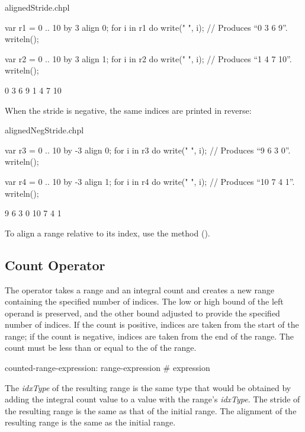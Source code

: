 \begin{chapelexample}{alignedStride.chpl}
\begin{chapel}
var r1 = 0 .. 10 by 3 align 0;
for i in r1 do
  write(" ", i);			// Produces ``0 3 6 9''.
writeln();

var r2 = 0 .. 10 by 3 align 1;
for i in r2 do
  write(" ", i);			// Produces ``1 4 7 10''.
writeln();
\end{chapel}
\begin{chapeloutput}
 0 3 6 9
 1 4 7 10
\end{chapeloutput}
\end{chapelexample}

When the stride is negative, the same indices are printed in reverse:
\begin{chapelexample}{alignedNegStride.chpl}
\begin{chapel}
var r3 = 0 .. 10 by -3 align 0;
for i in r3 do
  write(" ", i);			// Produces ``9 6 3 0''.
writeln();

var r4 = 0 .. 10 by -3 align 1;
for i in r4 do
  write(" ", i);			// Produces ``10 7 4 1''.
writeln();
\end{chapel}
\begin{chapeloutput}
 9 6 3 0
 10 7 4 1
\end{chapeloutput}
\end{chapelexample}

To align a range relative to its  index, use
the  method ().


\subsection{Count Operator}
\label{Count_Operator}

The \chpl{#} operator takes a range and an integral count and creates a new
range containing the specified number of indices.  The low or high bound of the
left operand is preserved, and the other bound adjusted to provide the specified
number of indices.  If the count is positive, indices are taken from the start
of the range; if the count is negative, indices are taken from the end of the
range.  The count must be less than or equal to the  of the range.

\begin{syntax}
counted-range-expression:
  range-expression # expression
\end{syntax}

The \emph{idxType} of the resulting range is the same type that would be
obtained by adding the integral count value to a value with the
range's \emph{idxType}.  The stride of the resulting range is the same as that
of the initial range.  The alignment of the resulting range is the same as the
initial range.

